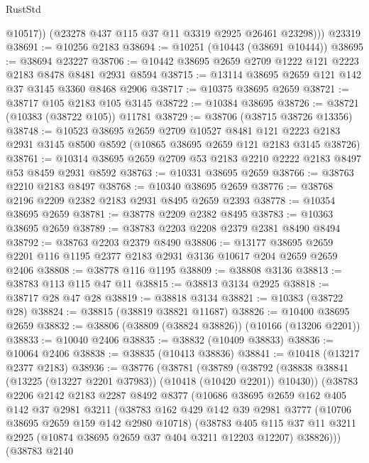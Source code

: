 \begin{lexlean}{RustStd}
\begin{coremodule}
            @10517))
        (@23278 @437 @115 @37 @11 @3319 @2925 @26461 @23298)))
    @23319
@38691 := @10256 @2183
@38694 := @10251 (@10443 (@38691 @10444))
@38695 := @38694 @23227
@38706 := @10442 @38695 @2659 @2709 @1222 @121 @2223 @2183 @8478 @8481 @2931 @8594
@38715 := @13114 @38695 @2659 @121 @142 @37 @3145 @3360 @8468 @2906
@38717 := @10375 @38695 @2659
@38721 := @38717 @105 @2183 @105 @3145
@38722 := @10384 @38695
@38726 := @38721 (@10383 (@38722 @105)) @11781
@38729 := @38706 (@38715 @38726 @13356)
@38748 := @10523
    @38695
    @2659
    @2709
    @10527
    @8481
    @121
    @2223
    @2183
    @2931
    @3145
    @8500
    @8592
    (@10865 @38695 @2659 @121 @2183 @3145 @38726)
@38761 := @10314 @38695 @2659 @2709 @53 @2183 @2210 @2222 @2183 @8497 @53 @8459 @2931 @8592
@38763 := @10331 @38695 @2659
@38766 := @38763 @2210 @2183 @8497
@38768 := @10340 @38695 @2659
@38776 := @38768 @2196 @2209 @2382 @2183 @2931 @8495 @2659 @2393
@38778 := @10354 @38695 @2659
@38781 := @38778 @2209 @2382 @8495
@38783 := @10363 @38695 @2659
@38789 := @38783 @2203 @2208 @2379 @2381 @8490 @8494
@38792 := @38763 @2203 @2379 @8490
@38806 := @13177 @38695 @2659 @2201 @116 @1195 @2377 @2183 @2931 @3136 @10617 @204 @2659 @2659 @2406
@38808 := @38778 @116 @1195
@38809 := @38808 @3136
@38813 := @38783 @113 @115 @47 @11
@38815 := @38813 @3134 @2925
@38818 := @38717 @28 @47 @28
@38819 := @38818 @3134
@38821 := @10383 (@38722 @28)
@38824 := @38815 (@38819 @38821 @11687)
@38826 := @10400 @38695 @2659
@38832 := @38806 (@38809 (@38824 @38826)) (@10166 (@13206 @2201))
@38833 := @10040 @2406
@38835 := @38832 (@10409 @38833)
@38836 := @10064 @2406
@38838 := @38835 (@10413 @38836)
@38841 := @10418 (@13217 @2377 @2183)
@38936 := @38776
    (@38781
      (@38789
        (@38792 (@38838 @38841 (@13225 (@13227 @2201 @37983)) (@10418 (@10420 @2201)) @10430))
        (@38783
          @2206
          @2142
          @2183
          @2287
          @8492
          @8377
          (@10686
            @38695
            @2659
            @162
            @405
            @142
            @37
            @2981
            @3211
            (@38783
              @162
              @429
              @142
              @39
              @2981
              @3777
              (@10706 @38695 @2659 @159 @142 @2980 @10718)
              (@38783
                @405
                @115
                @37
                @11
                @3211
                @2925
                (@10874 @38695 @2659 @37 @404 @3211 @12203 @12207)
                @38826)))
          (@38783
            @2140

\end{coremodule}
\end{lexlean}
